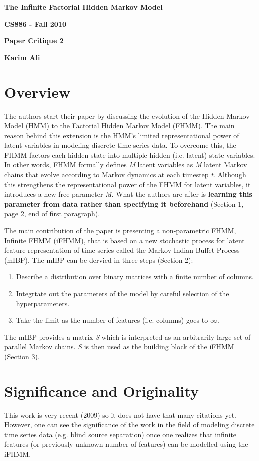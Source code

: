 \documentclass[11pt,a4paper]{article}
\begin{document}
\centerline{\sc \large \textbf{The Infinite Factorial Hidden Markov Model}}
\centerline{\textbf{CS886 - Fall 2010}}
\centerline{\textbf{Paper Critique 2}}
\centerline{\textbf{Karim Ali}}
\vspace{2pc}

\section{Overview}
The authors start their paper by discussing the evolution of the Hidden Markov Model (HMM) to the Factorial Hidden Markov Model (FHMM). The main reason
behind this extension is the HMM's limited representational power of latent variables in modeling discrete time series data. To overcome this, the FHMM factors
each hidden state into multiple hidden (i.e. latent) state variables. In other words, FHMM formally defines \textit{M} latent variables as \textit{M} latent
Markov chains that evolve according to Markov dynamics at each timestep \textit{t}. Although this strengthens the representational power of the FHMM for latent
variables, it introduces a new free parameter \textit{M}. What the authors are after is \textbf{learning this parameter from data rather than specifying it
beforehand} (Section 1, page 2, end of first paragraph).

The main contribution of the paper is presenting a non-parametric FHMM, Infinite FHMM (iFHMM), that is based on a new stochastic process for latent feature
representation of time series called the Markov Indian Buffet Process (mIBP). The mIBP can be dervied in three steps (Section 2):

\begin{enumerate}
 \item Describe a distribution over binary matrices with a finite number of columns.
 \item Integrtate out the parameters of the model by careful selection of the hyperparameters.
 \item Take the limit as the number of features (i.e. columns) goes to $\infty$.
\end{enumerate}

The mIBP provides a matrix \textit{S} which is interpreted as an arbitrarily large set of parallel Markov chains. \textit{S} is then used as the building block
of the iFHMM (Section 3).

\section{Significance and Originality}
This work is very recent (2009) so it does not have that many citations yet. However, one can see the significance of the work in the field of modeling
discrete time series data (e.g. blind source separation) once one realizes that infinite features (or previously unknown number of features) can be modelled
using the iFHMM.
\end{document}
